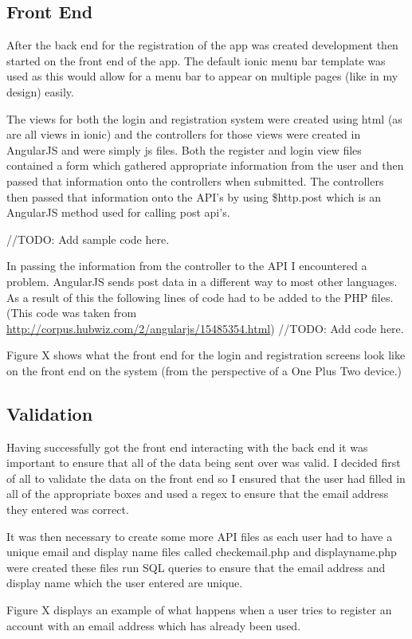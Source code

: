 \subsection{Front End}
After the back end for the registration of the app was created development then started on the front end of the app. The default ionic menu bar template was used as this would allow for a menu bar to appear on multiple pages (like in my design) easily.

The views for both the login and registration system were created using html (as are all views in ionic) and the controllers for those views were created in AngularJS and were simply js files. Both the register and login view files contained a form which gathered appropriate information from the user and then passed that information onto the controllers when submitted. The controllers then passed that information onto the API's by using \$http.post which is an AngularJS method used for calling post api's.

//TODO: Add sample code here.

In passing the information from the controller to the API I encountered a problem. AngularJS sends post data in a different way to most other languages. As a result of this the following lines of code had to be added to the PHP files. (This code was taken from \url{http://corpus.hubwiz.com/2/angularjs/15485354.html})
//TODO: Add code here.

Figure X shows what the front end for the login and registration screens look like on the front end on the system (from the perspective of a One Plus Two device.)

\subsection{Validation}
Having successfully got the front end interacting with the back end it was important to ensure that all of the data being sent over was valid. I decided first of all to validate the data on the front end so I ensured that the user had filled in all of the appropriate boxes and used a regex to ensure that the email address they entered was correct.

It was then necessary to create some more API files as each user had to have a unique email and display name files called checkemail.php and displayname.php were created these files run SQL queries to ensure that the email address and display name which the user entered are unique.

Figure X displays an example of what happens when a user tries to register an account with an email address which has already been used.



